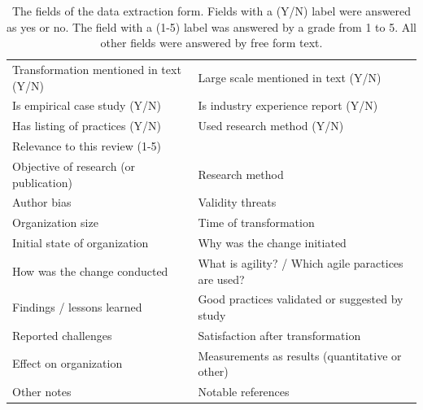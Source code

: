 \documentclass[lnbip]{svmultln}
\begin{document}
\begin{table}
    \begin{tabular}{ p{}@{ \hskip 0.2cm } l }
        \toprule
        Transformation mentioned in \newline text (Y/N) &
        Large scale mentioned in text (Y/N) \\
        Is empirical case study (Y/N) &
        Is industry experience report (Y/N) \\
        Has listing of practices (Y/N) &
        Used research method (Y/N) \\
        Relevance to this review (1-5) & \\
        Objective of research (or publication) &
        Research method \\
        Author bias &
        Validity threats \\
        Organization size &
        Time of transformation \\
        Initial state of organization &
        Why was the change initiated \\
        How was the change conducted &
        What is agility? / Which agile paractices are used? \\
        Findings / lessons learned &
        Good practices validated or suggested by study \\
        Reported challenges &
        Satisfaction after transformation \\
        Effect on organization &
        Measurements as results (quantitative or other) \\
        Other notes &
        Notable references \\
        \bottomrule
    \end{tabular}
    \caption{The fields of the data extraction form. Fields with a (Y/N) label
    were answered as yes or no. The field with a (1-5) label was answered by a
    grade from 1 to 5. All other fields were answered by free form text.}
    \label{table:dataform}
\end{table}


%
%
\end{document}
